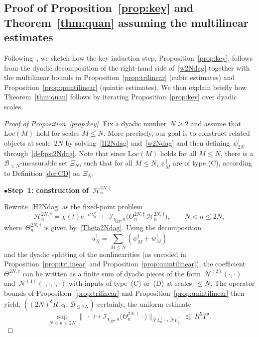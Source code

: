 \documentclass[11pt,reqno,english]{amsart}
\numberwithin{equation}{section}
\theoremstyle{plain}
\theoremstyle{definition}
\theoremstyle{remark}
\newcommand{\noi}{\noindent}
\newcommand{\e}{\mathrm{e}}
\begin{document}
\subsection{Proof of Proposition~\ref{prop:key} and Theorem~\ref{thm:quan} assuming the multilinear estimates}


Following~\cite{BCST24}, we sketch how the key induction step, Proposition~\ref{prop:key}, follows from
the dyadic decomposition of the right-hand side of~\eqref{w2Ndag} together with the
multilinear bounds in Proposition~\ref{prop:trilinear} (cubic estimates) and
Proposition~\ref{prop:quintilinear} (quintic estimates). We then explain briefly how
Theorem~\ref{thm:quan} follows by iterating Proposition~\ref{prop:key} over dyadic scales.

\begin{proof}[Proof of Proposition~\ref{prop:key}]
	Fix a dyadic number~$N\ge 2$ and assume that~$\mathrm{Loc}(M)$ hold for scales $M\leq N$. More precisely, our goal is to construct related objects at scale~$2N$ by solving~\eqref{H2Ndag} and~\eqref{w2Ndag} and then defining~$\psi_{2N}^{\dag}$ through~\eqref{def:psi2Ndag}. Note that since Loc$(M)$ holds for all $M\leq N$, there is a $\mathcal{B}_{\leq N}$-measurable set $\Xi_N$, such that for all $M\leq N$, $\psi_{M}^{\dag}$ are of type (C), according to Definition \ref{def:CD} on $\Xi_N$.

	\noi
	$\bullet${\bf Step~1: construction of~$\mathcal{H}_n^{2N,\dag}$}
	
	Rewrite~\eqref{H2Ndag} as the fixed-point problem
	\[
	\mathcal{H}_n^{2N,\dag}=\chi(t)\e^{-it\lambda_n^2}\;+\;\mathcal{I}_{\chi_{2T},n}\big(\Theta_n^{2N,\dag}\,\mathcal{H}_n^{2N,\dag}\big),
	\qquad N<n\le 2N,
	\]
	where~$\Theta_n^{2N,\dag}$ is given by~\eqref{Theta2Ndag}. Using the decomposition
	\[
	u_N^{\dag}=\sum_{M\le N}(\psi_M^{\dag}+w_M^{\dag})
	\]
	and the dyadic splitting of the nonlinearities (as encoded in
	Proposition~\ref{prop:trilinear} and Proposition~\ref{prop:quintilinear}),
	the coefficient~$\Theta^{2N,\dag}$ can be written as a finite sum of dyadic pieces of the form~$\mathcal{N}^{(2)}(\cdot,\cdot)$ and~$\mathcal{N}^{(4)}(\cdot,\cdot,\cdot,\cdot)$ with inputs
	of type~(C) or~(D) at scales~$\le N$.
	The operator bounds of Proposition~\ref{prop:trilinear} and
	Proposition~\ref{prop:quintilinear} then yield, $((2N)^{\delta}R,c_0;\mathcal{B}_{\le 2N})$-certainly,
	the uniform estimate
	\[
	\sup_{N<n\le 2N}
	\big\|\ \cdot\ \mapsto \mathcal{I}_{\chi_{2T},n}\big(\Theta_n^{2N,\dag}\,\cdot\big)\big\|_
	{\widetilde{\mathcal{F}}L_q^{\gamma}\to\widetilde{\mathcal{F}}L_q^{\gamma}}
	\ \lesssim\ R^5T^{\sigma}.
	\]


\end{proof}
\end{document}
